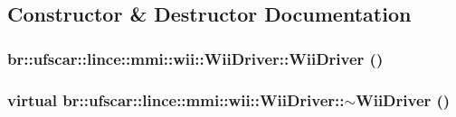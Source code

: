 \subsection{Constructor \& Destructor Documentation}
\hypertarget{classbr_1_1ufscar_1_1lince_1_1mmi_1_1wii_1_1WiiDriver_aab5fa49a7f90c20ea316a912c5b335fc}{
\subsubsection[{WiiDriver}]{\setlength{\rightskip}{0pt plus 5cm}br::ufscar::lince::mmi::wii::WiiDriver::WiiDriver ()}}
\label{classbr_1_1ufscar_1_1lince_1_1mmi_1_1wii_1_1WiiDriver_aab5fa49a7f90c20ea316a912c5b335fc}
\hypertarget{classbr_1_1ufscar_1_1lince_1_1mmi_1_1wii_1_1WiiDriver_afec30a49896ecbfdef96b7043fa2a799}{
\subsubsection[{$\sim$WiiDriver}]{\setlength{\rightskip}{0pt plus 5cm}virtual br::ufscar::lince::mmi::wii::WiiDriver::$\sim$WiiDriver ()}}
\label{classbr_1_1ufscar_1_1lince_1_1mmi_1_1wii_1_1WiiDriver_afec30a49896ecbfdef96b7043fa2a799}


